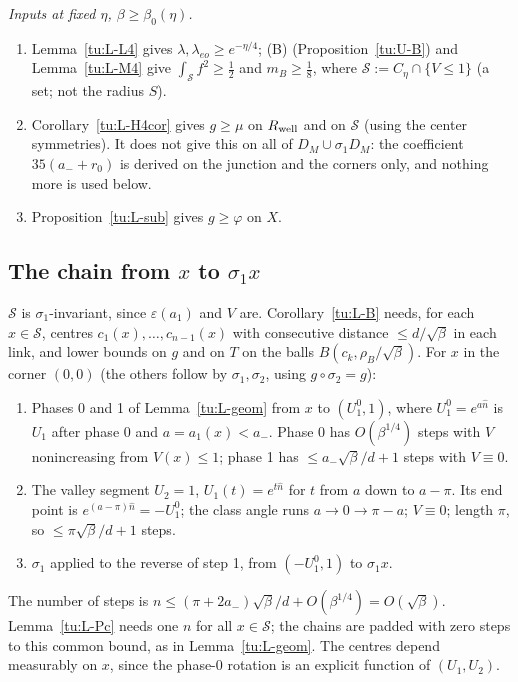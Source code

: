 \noindent\emph{Inputs at fixed $\eta$, $\beta\ge\beta_0(\eta)$.}
\begin{enumerate}
\item Lemma~\ref{tu:L-L4} gives $\lambda,\lambda_{eo}\ge e^{-\eta/4}$; (B) (Proposition~\ref{tu:U-B}) and Lemma~\ref{tu:L-M4} give
$\int_{\mathcal S}f^2\ge\frac12$ and $m_B\ge\frac18$, where $\mathcal S:=C_\eta\cap\{V\le1\}$ (a set; not the radius $S$).
\item Corollary~\ref{tu:L-H4cor} gives $g\ge\mu$ on $R_{\rm well}$ and on $\mathcal S$ (using the center symmetries). It does not give this on all of $D_M\cup\sigma_1D_M$: the coefficient $35(a_-+r_0)$ is derived on the junction and the corners only, and nothing more is used below.
\item Proposition~\ref{tu:L-sub} gives $g\ge\varphi$ on $X$.
\end{enumerate}

\subsection{The chain from $x$ to $\sigma_1x$}\label{tu:L-chainsec}
$\mathcal S$ is $\sigma_1$-invariant, since $\varepsilon(a_1)$ and $V$ are. Corollary~\ref{tu:L-B} needs, for each $x\in\mathcal S$, centres
$c_1(x),\dots,c_{n-1}(x)$ with consecutive distance $\le d/\sqrt\beta$ in each link, and lower bounds on $g$ and on $T$ on the
balls $B(c_k,\rho_B/\sqrt\beta)$. For $x$ in the corner $(0,0)$ (the others follow by $\sigma_1,\sigma_2$, using $g\circ\sigma_2=g$):
\begin{enumerate}
\item Phases 0 and 1 of Lemma~\ref{tu:L-geom} from $x$ to $(U_1^0,1)$, where $U_1^0=e^{a\hat n}$ is $U_1$ after phase 0 and
$a=a_1(x)<a_-$. Phase 0 has $O(\beta^{1/4})$ steps with $V$ nonincreasing from $V(x)\le1$; phase 1 has $\le a_-\sqrt\beta/d+1$ steps with $V\equiv0$.
\item The valley segment $U_2=1$, $U_1(t)=e^{t\hat n}$ for $t$ from $a$ down to $a-\pi$. Its end point is $e^{(a-\pi)\hat n}=-U_1^0$; the
class angle runs $a\to0\to\pi-a$; $V\equiv0$; length $\pi$, so $\le\pi\sqrt\beta/d+1$ steps.
\item $\sigma_1$ applied to the reverse of step 1, from $(-U_1^0,1)$ to $\sigma_1x$.
\end{enumerate}
The number of steps is $n\le(\pi+2a_-)\sqrt\beta/d+O(\beta^{1/4})=O(\sqrt\beta)$. Lemma~\ref{tu:L-Pc} needs one $n$ for all
$x\in\mathcal S$; the chains are padded with zero steps to this common bound, as in Lemma~\ref{tu:L-geom}. The centres depend measurably on $x$, since the
phase-0 rotation is an explicit function of $(U_1,U_2)$.

